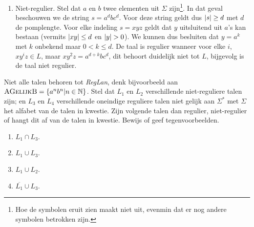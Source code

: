 \documentclass{article}
\newcommand{\lang}[1]{\textsc{#1}}
\begin{document}
\begin{answer}
\begin{enumerate}
 \item Niet-regulier. Stel dat $a$ en $b$ twee elementen uit $\Sigma$ zijn\footnote{Hoe de symbolen eruit zien maakt niet uit, evenmin dat er nog andere symbolen betrokken zijn.}. In dat geval beschouwen we de string $s=a^dbc^d$. Voor deze string geldt dus $\left|s\right|\geq d$ met $d$ de pomplengte. Voor elke indeling $s=xyz$ geldt dat $y$ uitsluitend uit $a$'s kan bestaan (vermits $\left|xy\right|\leq d$ en $\abs{y}>0$). We kunnen dus besluiten dat $y=a^k$ met $k$ onbekend maar $0<k\leq d$. De taal is regulier wanneer voor elke $i$, $xy^iz\in L$, maar $xy^2z=a^{d+k}bc^d$, dit behoort duidelijk niet tot $L$, bijgevolg is de taal niet regulier.
\end{enumerate}
\end{answer}
\begin{question}
Niet alle talen behoren tot \emph{RegLan}, denk bijvoorbeeld aan $\lang{AGelijkB}=\accl{a^nb^n|n\in\NN}$. Stel dat $L_1$
en $L_2$ verschillende niet-reguliere talen zijn; en $L_3$ en $L_4$ verschillende oneindige reguliere talen niet gelijk
aan $\Sigma^*$ met $\Sigma$ het alfabet van de talen in kwestie. Zijn volgende talen dan regulier, niet-regulier of
hangt dit af van de talen in kwestie. Bewijs of geef tegenvoorbeelden.
\begin{enumerate}
 \item $L_1\cap L_3$.
 \item $L_1\cup L_3$.
 \item $L_1\cup L_2$.
 \item $\overline{L_1}\cup L_3$.
\end{enumerate}
\end{question}
\end{document}
